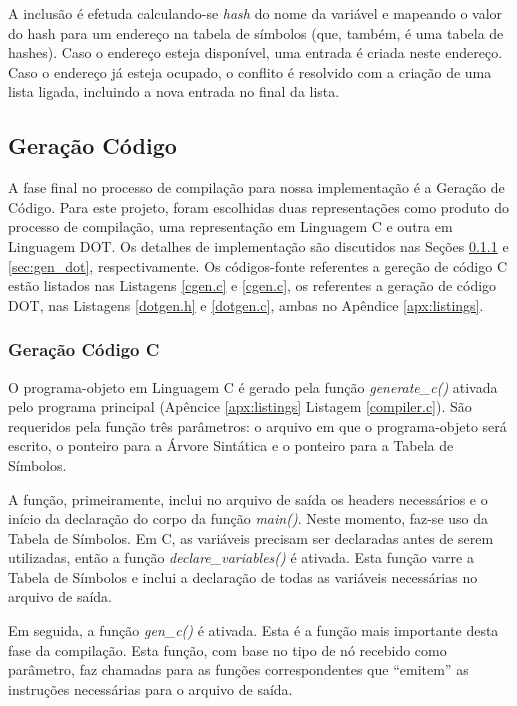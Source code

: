 A inclusão é efetuda calculando-se \emph{hash} do nome da variável e mapeando
o valor do hash para um endereço na tabela de símbolos (que, também, é uma
tabela de hashes). Caso o endereço esteja disponível, uma entrada é criada
neste endereço. Caso o endereço já esteja ocupado, o conflito é resolvido com
a criação de uma lista ligada, incluindo a nova entrada no final da lista.

\subsection{Geração Código}
\label{sec:gencode}

A fase final no processo de compilação para nossa implementação é a Geração de
Código. Para este projeto, foram escolhidas duas representações como produto
do processo de compilação, uma representação em Linguagem C e outra em
Linguagem DOT. Os detalhes de implementação são discutidos nas Seções
\ref{sec:gen_c} e \ref{sec:gen_dot}, respectivamente. Os códigos-fonte
referentes a gereção de código C estão listados nas Listagens \ref{cgen.c}
e \ref{cgen.c}, os referentes a geração de código DOT, nas Listagens
\ref{dotgen.h} e \ref{dotgen.c}, ambas no Apêndice \ref{apx:listings}.


\subsubsection{Geração Código C}
\label{sec:gen_c}
O programa-objeto em Linguagem C é gerado pela função \emph{generate\_c()}
ativada pelo programa principal (Apêncice \ref{apx:listings} Listagem
\ref{compiler.c}). São requeridos pela função três parâmetros: o arquivo em
que o programa-objeto será escrito, o ponteiro para a Árvore Sintática e o
ponteiro para a Tabela de Símbolos.

A função, primeiramente, inclui no arquivo de saída os headers necessários e
o início da declaração do corpo da função \emph{main()}. Neste momento, faz-se
uso da Tabela de Símbolos. Em C, as variáveis precisam ser declaradas antes de
serem utilizadas, então a função \emph{declare\_variables()} é ativada. Esta
função varre a Tabela de Símbolos e inclui a declaração de todas as variáveis
necessárias no arquivo de saída.

Em seguida, a função \emph{gen\_c()} é ativada. Esta é a função mais
importante desta fase da compilação. Esta função, com base no tipo de nó
recebido como parâmetro, faz chamadas para as funções correspondentes que
``emitem'' as instruções necessárias para o arquivo de saída.

